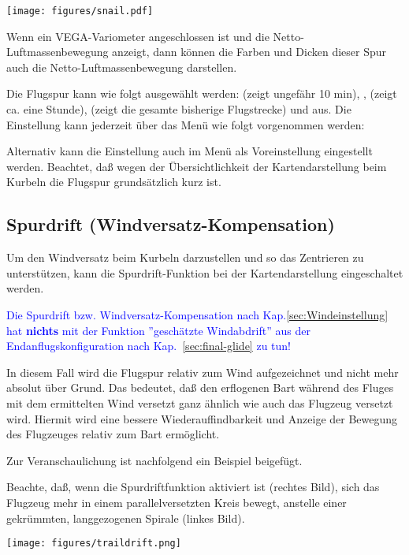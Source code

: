 \begin{center}
\texttt{[image: figures/snail.pdf]}
\end{center}

Wenn ein VEGA-Variometer angeschlossen ist und die Netto-Luftmassenbewegung anzeigt, dann können die Farben und Dicken dieser Spur auch die Netto-Luftmassenbewegung darstellen.

Die Flugspur kann wie folgt ausgewählt werden:  (zeigt ungefähr 10 min),  , (zeigt ca. eine Stunde),  (zeigt die gesamte bisherige Flugstrecke) und aus. Die Einstellung kann jederzeit über das Menü wie folgt vorgenommen werden:

Alternativ kann die Einstellung auch im Menü   als Voreinstellung eingestellt werden.
Beachtet, daß wegen der Übersichtlichkeit der Kartendarstellung beim Kurbeln die Flugspur grundsätzlich kurz ist.
\subsection*{Spurdrift (Windversatz-Kompensation)}
Um den Windversatz beim Kurbeln darzustellen und so das Zentrieren zu unterstützen, kann die Spurdrift-Funktion bei der Kartendarstellung eingeschaltet werden.

 \textcolor{blue}{ Die Spurdrift bzw. Windversatz-Kompensation nach Kap.\ref{sec:Windeinstellung} hat \textbf{nichts}  mit der Funktion ''geschätzte Windabdrift'' \achtung aus der Endanflugskonfiguration nach Kap.~\ref{sec:final-glide} zu tun!}
 
In diesem Fall wird die Flugspur relativ zum Wind aufgezeichnet und nicht mehr absolut über Grund. Das bedeutet, daß  \xc den erflogenen Bart während des Fluges mit dem ermittelten Wind versetzt ganz ähnlich wie auch das Flugzeug versetzt wird. Hiermit wird eine bessere Wiederauffindbarkeit und  Anzeige der Bewegung des Flugzeuges relativ zum Bart ermöglicht.

Zur Veranschaulichung ist nachfolgend ein Beispiel beigefügt. 

Beachte, daß, wenn die Spurdriftfunktion aktiviert ist (rechtes Bild), sich das Flugzeug mehr in einem parallelversetzten Kreis  bewegt, anstelle einer gekrümmten, langgezogenen Spirale (linkes Bild).

\begin{center}
\texttt{[image: figures/traildrift.png]}
\end{center}

